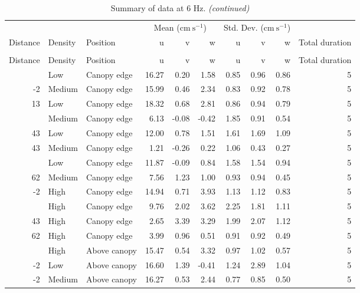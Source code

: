 \documentclass[10pt,]{article}
\begin{document}
\clearpage
\begingroup\fontsize{7}{9}\selectfont

\begin{longtable}{rllrrrrrrr}
\caption{\label{tab:unnamed-chunk-2}Summary of data at 6 Hz.}\\
\toprule
\multicolumn{3}{c}{ } & \multicolumn{3}{c}{Mean ($\text{cm}~\text{s}^{-1}$)} & \multicolumn{3}{c}{Std. Dev. ($\text{cm}~\text{s}^{-1}$)} \\
\cmidrule(l{2pt}r{2pt}){4-6} \cmidrule(l{2pt}r{2pt}){7-9}
Distance & Density & Position & u & v & w & u & v & w & Total duration\\
\midrule
\endfirsthead
\caption[]{\label{tab:unnamed-chunk-2}Summary of data at 6 Hz. \textit{(continued)}}\\
\toprule
Distance & Density & Position & u & v & w & u & v & w & Total duration\\
\midrule
\endhead
\
\endfoot
\bottomrule
\endlastfoot
-2 & Low & Canopy edge & 16.27 & 0.20 & 1.58 & 0.85 & 0.96 & 0.86 & 5\\
-2 & Medium & Canopy edge & 15.99 & 0.46 & 2.34 & 0.83 & 0.92 & 0.78 & 5\\
13 & Low & Canopy edge & 18.32 & 0.68 & 2.81 & 0.86 & 0.94 & 0.79 & 5\\
\addlinespace
13 & Medium & Canopy edge & 6.13 & -0.08 & -0.42 & 1.85 & 0.91 & 0.54 & 5\\
43 & Low & Canopy edge & 12.00 & 0.78 & 1.51 & 1.61 & 1.69 & 1.09 & 5\\
43 & Medium & Canopy edge & 1.21 & -0.26 & 0.22 & 1.06 & 0.43 & 0.27 & 5\\
\addlinespace
62 & Low & Canopy edge & 11.87 & -0.09 & 0.84 & 1.58 & 1.54 & 0.94 & 5\\
62 & Medium & Canopy edge & 7.56 & 1.23 & 1.00 & 0.93 & 0.94 & 0.45 & 5\\
-2 & High & Canopy edge & 14.94 & 0.71 & 3.93 & 1.13 & 1.12 & 0.83 & 5\\
\addlinespace
13 & High & Canopy edge & 9.76 & 2.02 & 3.62 & 2.25 & 1.81 & 1.11 & 5\\
43 & High & Canopy edge & 2.65 & 3.39 & 3.29 & 1.99 & 2.07 & 1.12 & 5\\
62 & High & Canopy edge & 3.99 & 0.96 & 0.51 & 0.91 & 0.92 & 0.49 & 5\\
\addlinespace
-2 & High & Above canopy & 15.47 & 0.54 & 3.32 & 0.97 & 1.02 & 0.57 & 5\\
-2 & Low & Above canopy & 16.60 & 1.39 & -0.41 & 1.24 & 2.89 & 1.04 & 5\\
-2 & Medium & Above canopy & 16.27 & 0.53 & 2.44 & 0.77 & 0.85 & 0.50 & 5\\

\end{longtable}
\end{document}
